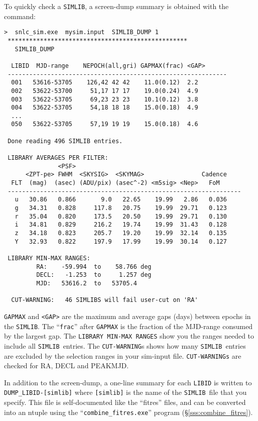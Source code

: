 \documentclass[12pt]{article}
\newcommand{\simlib}{{\tt SIMLIB}}
\begin{document}
To quickly check a \simlib,
a screen-dump summary is obtained 
with the command:
%
\begin{Verbatim}[frame=single]
  >  snlc_sim.exe  mysim.input  SIMLIB_DUMP 1 
 ************************************************** 
   SIMLIB_DUMP  

  LIBID  MJD-range    NEPOCH(all,gri) GAPMAX(frac) <GAP> 
 ------------------------------------------------------------- 
  001   53616-53705    126,42 42 42    11.0(0.12)  2.2 
  002   53622-53700     51,17 17 17    19.0(0.24)  4.9 
  003   53622-53705     69,23 23 23    10.1(0.12)  3.8 
  004   53622-53705     54,18 18 18    15.0(0.18)  4.9 
  ...
  050   53622-53705     57,19 19 19    15.0(0.18)  4.6 

 Done reading 496 SIMLIB entries. 

 LIBRARY AVERAGES PER FILTER:  
               <PSF>  
      <ZPT-pe> FWHM  <SKYSIG>  <SKYMAG>                Cadence 
  FLT  (mag)  (asec) (ADU/pix) (asec^-2) <m5sig> <Nep>   FoM   
 ----------------------------------------------------------------- 
   u   30.86   0.866       9.0   22.65    19.99   2.86   0.036 
   g   34.31   0.828     117.8   20.75    19.99  29.71   0.123 
   r   35.04   0.820     173.5   20.50    19.99  29.71   0.130 
   i   34.81   0.829     216.2   19.74    19.99  31.43   0.128 
   z   34.18   0.823     205.7   19.20    19.99  32.14   0.135 
   Y   32.93   0.822     197.9   17.99    19.99  30.14   0.127 

 LIBRARY MIN-MAX RANGES:  
         RA:    -59.994  to    58.766 deg 
         DECL:   -1.253  to     1.257 deg 
         MJD:   53616.2  to   53705.4 

  CUT-WARNING:   46 SIMLIBS will fail user-cut on 'RA' 
\end{Verbatim}
%
{\tt GAPMAX} and {\tt <GAP>} are the 
maximum and average gaps (days) between epochs in the {\tt SIMLIB}.
The ``{\tt frac}'' after {\tt GAPMAX} is the fraction of the
MJD-range consumed by the largest gap.
The {\tt LIBRARY MIN-MAX RANGES} show you the ranges
needed to include all \simlib\ entries. 
The {\tt CUT-WARNING}s  shows how many \simlib\ entries
are excluded by the selection ranges in your sim-input file.
{\tt CUT-WARNINGs} are checked for RA, DECL and PEAKMJD.


In addition to the screen-dump, a one-line summary for each 
{\tt LIBID} is written to {\tt DUMP\_LIBID-[simlib]} where
{\tt [simlib]} is the name of the \simlib\ file that you
specify.
This file is self-documented like the ``fitres'' files,
and can be converted into an ntuple using the
``{\tt combine\_fitres.exe}'' program (\S\ref{sss:combine_fitres}).
\end{document}
